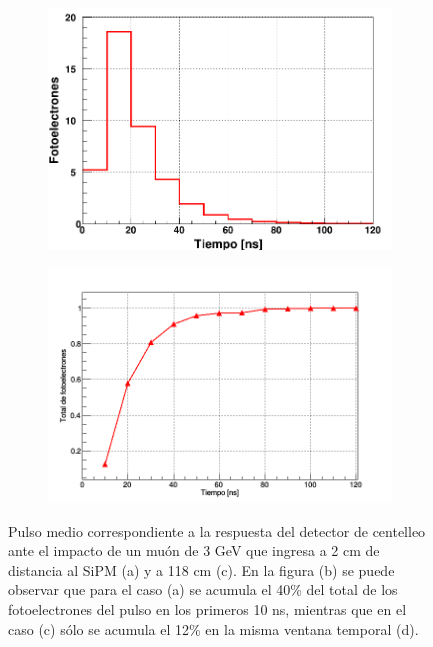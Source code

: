 \documentclass[12pt,oneside,openany,letter]{book}
\begin{document}
\begin{figure}[h!]
\begin{subfigure}{0.5\textwidth}
        \label{2cmcum}
    \end{subfigure}
    \begin{subfigure}{0.44\textwidth}
        \includegraphics[width=\textwidth]{images/a118cm_pulso.png}
        \caption{}
        \label{a118cm_pulso}
    \end{subfigure}
    \begin{subfigure}{0.5\textwidth}
        \includegraphics[width=\textwidth]{images/118cmcum.png}
        \caption{}
        \label{118cmcum}
    \end{subfigure}
    \caption[Pulso medio correspondiente a un muón de 3 GeV en el detector de centelleo]{Pulso medio correspondiente a la respuesta del detector de centelleo ante el impacto de un muón de 3 GeV que ingresa a 2 cm de distancia al SiPM (a) y a 118 cm (c). En la figura (b) se puede observar que para el caso (a) se acumula el 40\% del total de los fotoelectrones del pulso en los primeros 10 ns, mientras que en el caso (c) sólo se acumula el 12\% en la misma ventana temporal (d).}\label{Pulsos_barra}
\end{figure}
\end{document}

